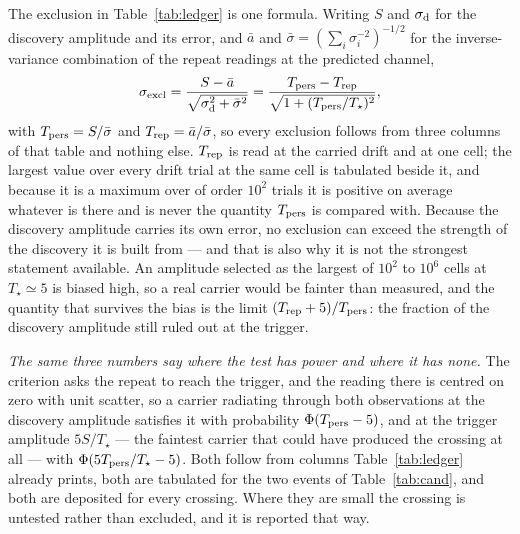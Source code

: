 The exclusion in Table~\ref{tab:ledger} is one formula. Writing $S$ and
$\sigma_{\rm d}$ for the discovery amplitude and its error, and $\bar{a}$ and
$\bar{\sigma}=(\sum_i\sigma_i^{-2})^{-1/2}$ for the inverse-variance
combination of the repeat readings at the predicted channel,
\begin{equation}
\sigma_{\rm excl}=\frac{S-\bar{a}}
{\sqrt{\sigma_{\rm d}^{2}+\bar{\sigma}^{2}}}
=\frac{T_{\rm pers}-T_{\rm rep}}{\sqrt{1+(T_{\rm pers}/T_\star)^{2}}},
\label{eq:excl}
\end{equation}
with $T_{\rm pers}=S/\bar{\sigma}$ and $T_{\rm rep}=\bar{a}/\bar{\sigma}$, so
every exclusion follows from three columns of that table and nothing else.
$T_{\rm rep}$ is read at the carried drift and at one cell; the largest value
over every drift trial at the same cell is tabulated beside it, and because it
is a maximum over of order $10^{2}$ trials it is positive on average whatever
is there and is never the quantity $T_{\rm pers}$ is compared with. Because the
discovery amplitude carries its own error, no exclusion can exceed the strength
of the discovery it is built from --- and that is also why it is not the
strongest statement available. An amplitude selected as the largest of
$10^{2}$ to $10^{6}$ cells at $T_\star\simeq5$ is biased high, so a real
carrier would be fainter than measured, and the quantity that survives the
bias is the limit $(T_{\rm rep}+5)/T_{\rm pers}$: the fraction of the
discovery amplitude still ruled out at the trigger.

\emph{The same three numbers say where the test has power and where it has
none.} The criterion asks the repeat to reach the trigger, and the reading
there is centred on zero with unit scatter, so a carrier radiating through
both observations at the discovery amplitude satisfies it with probability
$\Phi(T_{\rm pers}-5)$, and at the trigger amplitude $5S/T_\star$ ---
the faintest carrier that could have produced the crossing at all ---
with $\Phi(5T_{\rm pers}/T_\star-5)$. Both follow from columns
Table~\ref{tab:ledger} already prints, both are tabulated for the two events
of Table~\ref{tab:cand}, and both are deposited for every crossing. Where
they are small the crossing is untested rather than excluded, and it is
reported that way.


